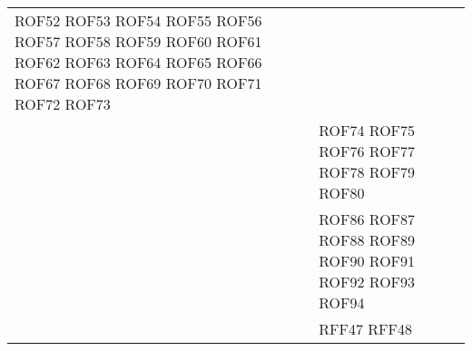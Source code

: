 \documentclass[../DefinizioneDiProdotto_v2.0.0.tex]{subfiles}
\begin{document}
\begin{longtable}{p{8.5cm}!{\VRule[1pt]}p{2.5cm}}
	ROF52 \newline
	ROF53 \newline
	ROF54 \newline
	ROF55 \newline
	ROF56 \newline
	ROF57 \newline
	ROF58 \newline
	ROF59 \newline
	ROF60 \newline
	ROF61 \newline
	ROF62 \newline
	ROF63 \newline
	ROF64 \newline
	ROF65 \newline
	ROF66 \newline
	ROF67 \newline
	ROF68 \newline
	ROF69 \newline
	ROF70 \newline
	ROF71 \newline
	ROF72 \newline
	ROF73 \\
	                   & ROF74 \newline
	ROF75 \newline
	ROF76 \newline
	ROF77 \newline
	ROF78 \newline
	ROF79 \newline
	ROF80 \newline
	 \\
	                                                                       & ROF86 \newline
	ROF87 \newline
	ROF88 \newline
	ROF89 \newline
	ROF90 \newline
	ROF91 \newline
	ROF92 \newline
	ROF93 \newline
	ROF94
	 \\
	                                                                        & RFF47 \newline
	RFF48 \newline

\end{longtable}
\end{document}

